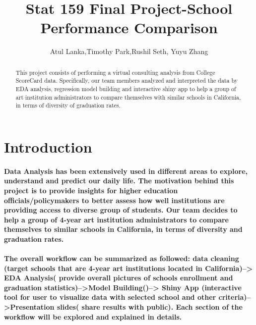 \usepackage{amsmath}
\usepackage{graphicx}
\usepackage[colorinlistoftodos]{todonotes}
\usepackage[colorlinks=true, allcolors=blue]{hyperref}

\title{Stat 159 Final Project-School Performance Comparison}
\author{Atul Lanka,Timothy Park,Rushil Seth, Yuyu Zhang}


\maketitle

\begin{abstract}
This project consists of performing a virtual consulting analysis from College ScoreCard data. Specifically, our team members analyzed and interpreted the data by EDA analysis, regression model building and interactive shiny app to help a group of art institution administrators to compare themselves with similar schools in California, in terms of diversity of graduation rates.
\end{abstract}

\section{Introduction}
\paragraph{Data Analysis has been extensively used in different areas to explore, understand and predict our daily life. The motivation behind this project is to provide insights for higher education officials/policymakers to better assess how well institutions are providing access to diverse group of students.  Our team decides to help a group of 4-year art institution administrators to compare themselves to similar schools in California, in terms of diversity and graduation rates.}

\paragraph{The overall workflow can be summarized as followed: data cleaning (target schools that are 4-year art institutions located in California)--> EDA Analysis( provide overall pictures of schools enrollment and graduation statistics)-->Model Building()--> Shiny App (interactive tool for user to visualize data with selected school and other criteria)-->Presentation slides( share results with public). Each section of the workflow will be explored and explained in details. }


